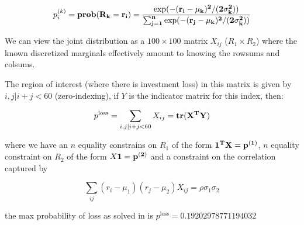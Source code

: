 \documentclass[12pt]{article}
\begin{document}
\begin{itemize}
  $$p_i^{(k)} = \bf{prob}(R_k = r_i) = \frac{\exp (-(r_i - \mu_k)^2 / (2 \sigma_k^2))}{\sum_{j=1}^n \exp (-(r_j - \mu_k)^2 / (2\sigma_k^2))}$$

  We can view the joint distribution as a $100 \times 100$ matrix $X_{ij}$ ($R_1 \times R_2$) where the known discretized marginals effectively amount to knowing the rowsums and colsums.

  The region of interest (where there is investment loss) in this matrix is given by ${i, j | i + j < 60}$ (zero-indexing), if $Y$ is the indicator matrix for this index, then:

  $$p^{\text{loss}} = \sum_{i, j | i + j < 60} X_{ij} = \bf{tr}(X^TY)$$

  where we have an $n$ equality constrains on $R_1$ of the form $\bf{1}^T X = p^{(1)}$, $n$ equality constraint on $R_2$ of the form $X \bf{1} = p^{(2)}$ and a constraint on the correlation captured by

  $$\sum_{ij} (r_i - \mu_1)(r_j - \mu_2) X_{ij} = \rho \sigma_1 \sigma_2$$

  the max probability of loss as solved in is $p^{\text{loss}} = 0.19202978771194032$
  
\end{itemize}
\end{document}
